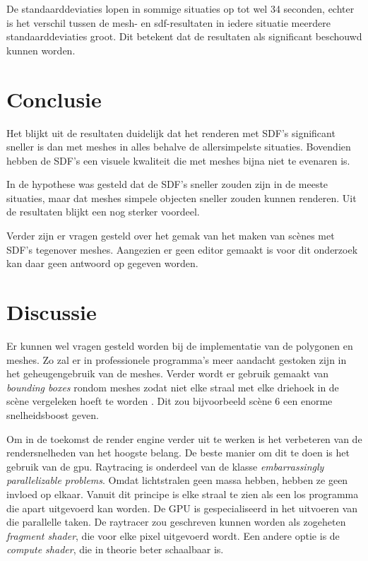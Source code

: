 \documentclass[12pt, a4paper]{article}
\begin{document}
De standaarddeviaties lopen in sommige situaties op tot wel 34 seconden, echter is het verschil tussen de mesh- en sdf-resultaten in iedere situatie meerdere standaarddeviaties groot. Dit betekent dat de resultaten als significant beschouwd kunnen worden. 

\section{Conclusie}
Het blijkt uit de resultaten duidelijk dat het renderen met SDF's significant sneller is dan met meshes in alles behalve de allersimpelste situaties. Bovendien hebben de SDF's een visuele kwaliteit die met meshes bijna niet te evenaren is. 

In de hypothese was gesteld dat de SDF's sneller zouden zijn in de meeste situaties, maar dat meshes simpele objecten sneller zouden kunnen renderen. Uit de resultaten blijkt een nog sterker voordeel. 

Verder zijn er vragen gesteld over het gemak van het maken van scènes met SDF's tegenover meshes. Aangezien er geen editor gemaakt is voor dit onderzoek kan daar geen antwoord op gegeven worden.

\section{Discussie}

Er kunnen wel vragen gesteld worden bij de implementatie van de polygonen en meshes. Zo zal er in professionele programma's meer aandacht gestoken zijn in het geheugengebruik van de meshes. Verder wordt er gebruik gemaakt van \textit{bounding boxes} rondom meshes zodat niet elke straal met elke driehoek in de scène vergeleken hoeft te worden \cite{BoundingVolumeHierarchy}. Dit zou bijvoorbeeld scène 6 een enorme snelheidsboost geven. 

Om in de toekomst de render engine verder uit te werken is het verbeteren van de rendersnelheden van het hoogste belang. De beste manier om dit te doen is het gebruik van de gpu. Raytracing is onderdeel van de klasse \textit{embarrassingly parallelizable problems}. Omdat lichtstralen geen massa hebben, hebben ze geen invloed op elkaar. Vanuit dit principe is elke straal te zien als een los programma die apart uitgevoerd kan worden. De GPU is gespecialiseerd in het uitvoeren van die parallelle taken. De raytracer zou geschreven kunnen worden als zogeheten \textit{fragment shader}, die voor elke pixel uitgevoerd wordt. Een andere optie is de \textit{compute shader}, die in theorie beter schaalbaar is.
\end{document}
